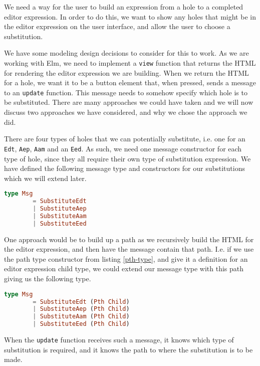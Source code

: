 We need a way for the user to build an expression from a hole to a completed
editor expression. In order to do this, we want to show any holes that might be
in the editor expression on the user interface, and allow the user to choose a
substitution.

We have some modeling design decisions to consider for this to work. As we are working
with Elm, we need to implement a \texttt{view} function that returns the HTML
for rendering the editor expression we are building. When we return the
HTML for a hole, we want it to be a button element that, when pressed, sends a
message to an \texttt{update} function. This message needs to somehow specify
which hole is to be substituted. There are many approaches we could have taken
and we will now discuss two approaches we have considered, and why we chose
the approach we did.

There are four types of holes that we can potentially substitute, i.e. one for
an \texttt{Edt}, \texttt{Aep}, \texttt{Aam} and an \texttt{Eed}. As such, we
need one message constructor for each type of hole, since they all require their
own type of substitution expression. We have defined the following message type
and constructors for our substitutions which we will extend later.

\begin{lstlisting}[language=elm,%
                   gobble=4,%
                   ]
    type Msg
        = SubstituteEdt
        | SubstituteAep
        | SubstituteAam
        | SubstituteEed
\end{lstlisting}

One approach would be to build up a path as we recursively build the HTML for
the editor expression, and then have the message contain that path. I.e. if we
use the path type constructor from listing \ref{pth-type}, and give it a
definition for an editor expression child type, we could extend our message type
with this path giving us the following type.

\begin{lstlisting}[language=elm,%
                   gobble=4,%
                   ]
    type Msg
        = SubstituteEdt (Pth Child)
        | SubstituteAep (Pth Child)
        | SubstituteAam (Pth Child)
        | SubstituteEed (Pth Child)
\end{lstlisting}

When the \texttt{update} function receives such a message, it knows which type
of substitution is required, and it knows the path to where the substitution is
to be made.

